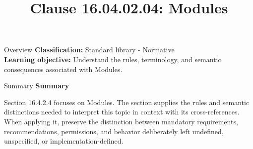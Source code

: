 \documentclass[10pt,letterpaper]{article}
\title{Clause 16.04.02.04: Modules}
\author{}
\date{}
\begin{document}
\maketitle
\begin{CornellOverviewBox}{Overview}
\textbf{Classification:} Standard library - Normative\\[2pt]
\textbf{Learning objective:} Understand the rules, terminology, and semantic consequences associated with Modules.
\end{CornellOverviewBox}\begin{CornellSummaryBox}{Summary}
{\sffamily\bfseries\color{Accent} Summary}\par\vspace{3pt}Section 16.4.2.4 focuses on Modules. The section supplies the rules and semantic distinctions needed to interpret this topic in context with its cross-references. When applying it, preserve the distinction between mandatory requirements, recommendations, permissions, and behavior deliberately left undefined, unspecified, or implementation-defined.
\end{CornellSummaryBox}
\end{document}
